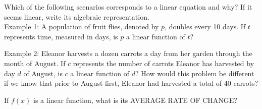 \documentclass[11pt]{article}
\begin{document}
\newpage

{} Which of the following scenarios corresponds to a linear equation and why? If it seems linear, write its algebraic representation.\\


Example 1:  A population of fruit flies, denoted by $p$, doubles every 10 days. If $t$ represents time, measured in days, is $p$ a linear function of $t$?\\
\vfill

Example 2: Eleanor harvests a dozen carrots a day from her  garden through the month of August. If  $c$ represents the number of carrots Eleanor has harvested by day $d$ of August, is $c$ a linear function of $d$? How would this problem be different if we know that prior to August first, Eleanor had 
harvested a total of 40 carrots?\\

\vfill

{}

If $f(x)$ is a linear function, what is its AVERAGE RATE OF CHANGE?\\

\vfill
\end{document}
